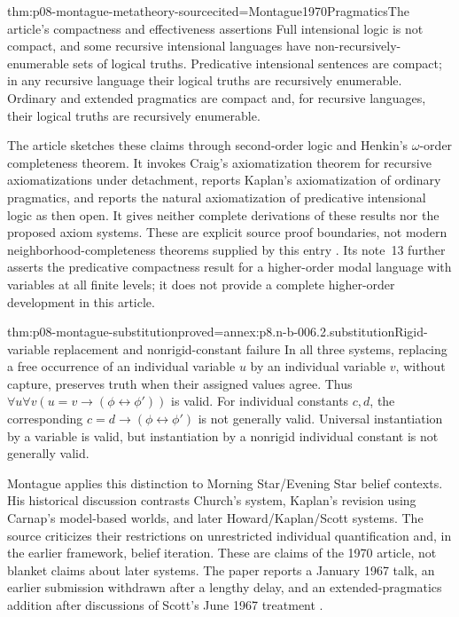 \begin{hbtheorem}{thm:p08-montague-metatheory-source}{cited=Montague1970Pragmatics}{The article's compactness and effectiveness assertions}
Full intensional logic is not compact, and some recursive intensional
languages have non-recursively-enumerable sets of logical truths.
Predicative intensional sentences are compact; in any recursive language
their logical truths are recursively enumerable. Ordinary and extended
pragmatics are compact and, for recursive languages, their logical
truths are recursively enumerable.

The article sketches these claims through second-order logic and
Henkin's \(\omega\)-order completeness theorem. It invokes Craig's
axiomatization theorem for recursive axiomatizations under detachment,
reports Kaplan's axiomatization of ordinary pragmatics, and reports
the natural axiomatization of predicative intensional logic as then open.
It gives neither complete derivations of these results nor the proposed
axiom systems. These are explicit source proof boundaries, not modern
neighborhood-completeness theorems supplied by this entry
\cite[pp.~88--90; note~13]{Montague1970Pragmatics}.
Its note~13 further asserts the predicative compactness result for a
higher-order modal language with variables at all finite levels; it does
not provide a complete higher-order development in this article.
\end{hbtheorem}

\begin{hbtheorem}{thm:p08-montague-substitution}{proved=annex:p8.n-b-006.2.substitution}{Rigid-variable replacement and nonrigid-constant failure}
In all three systems, replacing a free occurrence of an individual variable
\(u\) by an individual variable \(v\), without capture, preserves
truth when their assigned values agree. Thus
\(\forall u\forall v(u=v\to(\phi\leftrightarrow\phi'))\) is valid.
For individual constants \(c,d\), the corresponding
\(c=d\to(\phi\leftrightarrow\phi')\) is not generally valid.
Universal instantiation by a variable is valid, but instantiation by a
nonrigid individual constant is not generally valid.
\end{hbtheorem}

Montague applies this distinction to Morning Star/Evening Star belief
contexts. His historical discussion contrasts Church's system, Kaplan's
revision using Carnap's model-based worlds, and later Howard/Kaplan/Scott
systems. The source criticizes their restrictions on unrestricted
individual quantification and, in the earlier framework, belief
iteration. These are claims of the 1970 article, not blanket claims
about later systems. The paper reports a January 1967 talk, an earlier
submission withdrawn after a lengthy delay, and an extended-pragmatics
addition after discussions of Scott's June 1967 treatment
\cite[pp.~90--94]{Montague1970Pragmatics}.


